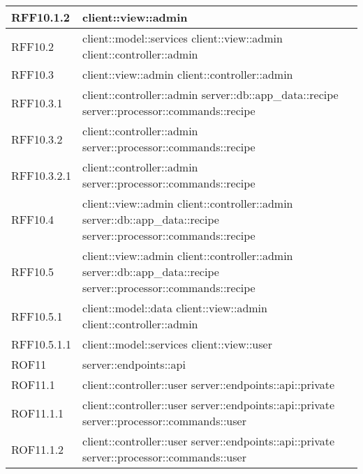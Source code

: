 \begin{center}
\begin{longtable}{| p{4cm} | p{8cm} |}
\hline
RFF10.1.2 & client::view::admin \\
\hline
RFF10.2 & client::model::services \newline client::view::admin \newline client::controller::admin \\
\hline
RFF10.3 & client::view::admin \newline client::controller::admin \\
\hline
RFF10.3.1 & client::controller::admin \newline server::db::app\_data::recipe \newline server::processor::commands::recipe \\
\hline
RFF10.3.2 & client::controller::admin \newline server::processor::commands::recipe \\
\hline
RFF10.3.2.1 & client::controller::admin \newline server::processor::commands::recipe \\
\hline
RFF10.4 & client::view::admin \newline client::controller::admin \newline server::db::app\_data::recipe \newline server::processor::commands::recipe \\
\hline
RFF10.5 & client::view::admin \newline client::controller::admin \newline server::db::app\_data::recipe \newline server::processor::commands::recipe \\
\hline
RFF10.5.1 & client::model::data \newline client::view::admin \newline client::controller::admin \\
\hline
RFF10.5.1.1 & client::model::services \newline client::view::user \\
\hline
ROF11 & server::endpoints::api \\
\hline
ROF11.1 & client::controller::user \newline server::endpoints::api::private \\
\hline
ROF11.1.1 & client::controller::user \newline server::endpoints::api::private \newline server::processor::commands::user \\
\hline
ROF11.1.2 & client::controller::user \newline server::endpoints::api::private \newline server::processor::commands::user \\

\end{longtable}
\end{center}
